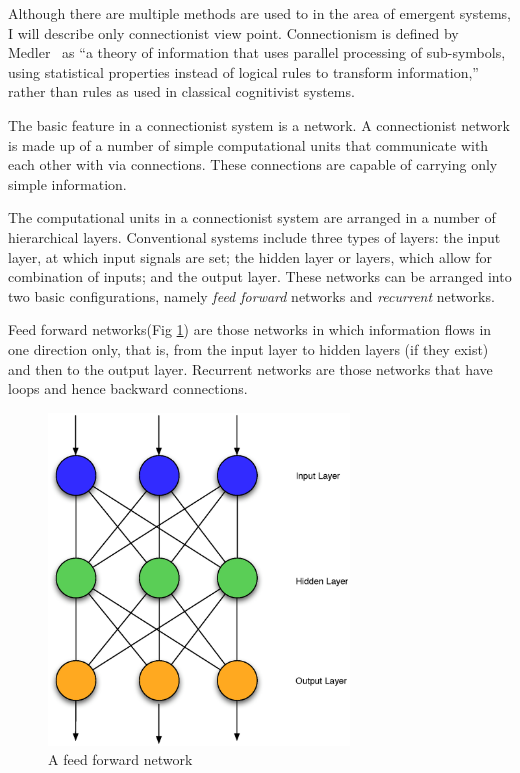      Although there are multiple methods are used to in the area of
     emergent systems, I will describe only connectionist view
     point. Connectionism is defined by Medler~\cite{Medler98abrief}
     as ``a theory of information that uses parallel processing of
     sub-symbols, using statistical properties instead of logical
     rules to transform information,'' rather than rules as used in
     classical cognitivist systems.

     The basic feature in a connectionist system is a 
     network. A connectionist network is made up of a number of simple
     computational units that communicate with each other with via
     connections. These connections are capable of carrying only
     simple information.
     
     The computational units in a connectionist system are arranged in
     a number of hierarchical layers.  Conventional systems include
     three types of layers: the input layer, at which input signals
     are set; the hidden layer or layers, which allow for combination
     of inputs; and the output layer. These networks can be arranged
     into two basic configurations, namely \emph{feed forward}
     networks and \emph{recurrent} networks.

     Feed forward networks(Fig \ref{ASCA_AFFN}) are those networks in
     which information flows in one direction only, that is, from the
     input layer to hidden layers (if they exist) and then to the
     output layer. Recurrent networks are those networks that have
     loops and hence backward connections.

     \begin{figure}[htp]
     \centering
     \includegraphics[width=80mm]{FeedForwardNetwork.eps}
     \caption{A feed forward network}
     \label{ASCA_AFFN}
     \end{figure}
     

